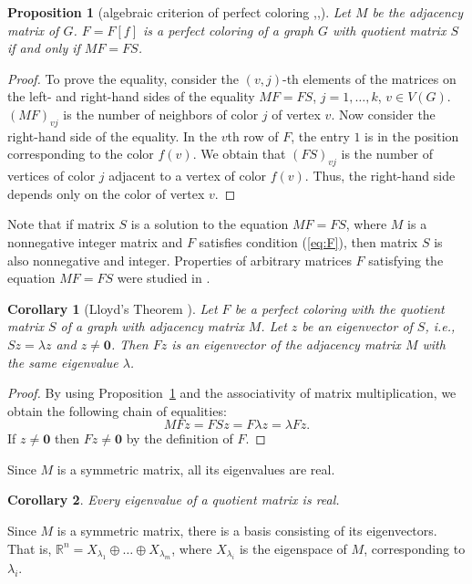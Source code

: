 \documentclass[11pt]{article}
\newtheorem{claim}{Proposition}[section]
\newtheorem{corollary}{Corollary}[section]
\theoremstyle{definition}
\begin{document}
\begin{claim}[algebraic criterion of perfect coloring \cite{Martin},\cite{Haemers1},\cite{Godsil}]\label{s:perfcol_criteria}
Let $M$ be the adjacency matrix of $G$. $F=F[f]$ is a
perfect coloring
of a graph $G$ with quotient matrix $S$ if and
only if $MF=FS$.
\end{claim}
\begin{proof} To prove the equality, consider the $(v, j)$-th elements of the matrices on the left-
and right-hand sides of the equality $MF=FS$, $j=1,\dots,k$, $v\in V(G)$.
$(MF)_{v j}$ is the number of neighbors of color $j$ of vertex $v$.
Now consider the right-hand side of the equality. In the $v$th row of $F$, the entry $1$ is in the position
corresponding to the color $f(v)$.  We obtain that $(FS)_{v j}$ is the number of vertices of color $j$ adjacent to a vertex of color $f(v)$.
Thus, the right-hand side depends only on the color of vertex $v$.
\end{proof}

Note that if matrix $S$ is a solution to the equation $MF=FS$,
where $M$ is a nonnegative integer matrix and $F$
satisfies condition (\ref{eq:F}), then matrix $S$ is also nonnegative and integer.  Properties of arbitrary matrices
$F$ satisfying the equation $MF=FS$ were studied in \cite{Taranenko}.

\begin{corollary}[Lloyd's Theorem \cite{Lloyd}]\label{p:perf_color_properties}
Let  $F$  be  a perfect 
coloring with the  quotient matrix $S$ of a graph with adjacency matrix $M$.  Let $z$ be an eigenvector of $S$, i.e., $Sz=\lambda z$
and $z\ne \mathbf{0}$. Then $Fz$ is an eigenvector
of the adjacency matrix $M$ with the same eigenvalue $\lambda$.
\end{corollary}
\begin{proof}
By using Proposition~\ref{s:perfcol_criteria}
and the associativity of matrix multiplication, we obtain the following chain of equalities:
\[
MFz=FSz=F\lambda z=\lambda Fz.
\]
 If
$z\neq \mathbf{0}$ then $Fz\neq \mathbf{0}$ by the definition of $F$.
\end{proof}

Since $M$ is a symmetric matrix, all its eigenvalues
are real.
\begin{corollary}
Every eigenvalue of  a quotient matrix is 
real. \end{corollary}

Since $M$ is a symmetric matrix, there is a basis consisting of
its eigenvectors. That is, $\mathbb
R^n=X_{\lambda_1}\oplus\ldots\oplus X_{\lambda_m}$,
where $X_{\lambda_i}$ is the eigenspace of $M$,
corresponding to $\lambda_i$.
\end{document}
